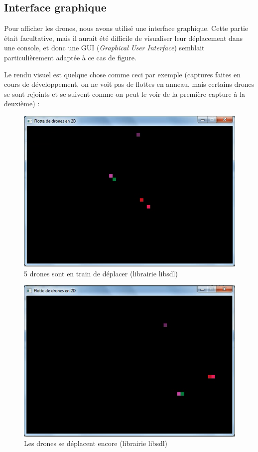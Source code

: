 \documentclass[11pt]{report}
\begin{document}
\subsection{Interface graphique}

Pour afficher les drones, nous avons utilisé une interface graphique. Cette partie était facultative, mais il aurait été difficile de visualiser leur déplacement dans une console, et donc une GUI (\textit{Graphical User Interface}) semblait particulièrement adaptée à ce cas de figure.

Le rendu visuel est quelque chose comme ceci par exemple (captures faites en cours de développement, on ne voit pas de flottes en anneau, mais certains drones se sont rejoints et se suivent comme on peut le voir de la première capture à la deuxième) :

\begin{figure}[h]
\centering
\includegraphics[scale = 0.9]{img/flotte-1.png}
\caption{5 drones sont en train de déplacer (librairie libsdl)}
\end{figure}

\begin{figure}
\centering
\includegraphics[scale = 0.9]{img/flotte-2.png}
\caption{Les drones se déplacent encore (librairie libsdl)}
\end{figure}
\end{document}
